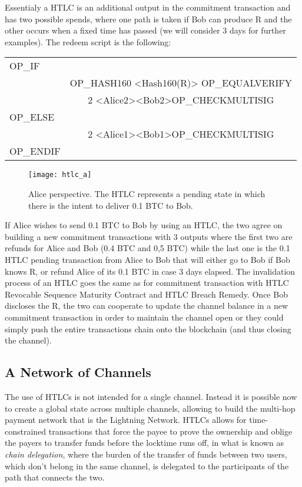		Essentialy a HTLC is an additional output in the commitment transaction and has two possible spends, where one path is taken if Bob can produce R and the other occurs when a fixed time has passed (we will consider 3 days for further examples). The redeem script is the following:
		\begin{center}
			\begin{tabulary}{\textwidth}{|L|C|}
				\hline
				OP\_IF & \\
				 & OP\_HASH160 <Hash160(R)> OP\_EQUALVERIFY \\
				 & 2 <Alice2><Bob2>OP\_CHECKMULTISIG \\ \hline
				OP\_ELSE & \\
				 & 2 <Alice1><Bob1>OP\_CHECKMULTISIG \\ \hline
				 OP\_ENDIF & \\
				 \hline				 
			\end{tabulary}
		\end{center}
	
		\begin{figure}
			\centering
			\texttt{[image: htlc\_a]}
			\caption{Alice perspective. The HTLC represents a pending state in which there is the intent to deliver 0.1 BTC to Bob.}
			\label{htlc_a}
		\end{figure}
	
		If Alice wishes to send 0.1 BTC to Bob by using an HTLC, the two agree on building a new commitment transactions with 3 outputs where the first two are refunds for Alice and Bob (0.4 BTC and 0,5 BTC) while the last one is the 0.1 HTLC pending transaction from Alice to Bob that will either go to Bob if Bob knows R, or refund Alice of its 0.1 BTC in case 3 days elapsed. The invalidation process of an HTLC goes the same as for commitment transaction with HTLC Revocable Sequence Maturity Contract and HTLC Breach Remedy. Once Bob discloses the R, the two can cooperate to update the channel balance in a new commitment transaction in order to maintain the channel open or they could simply push the entire transactions chain onto the blockchain (and thus closing the channel).
		
		\subsection{A Network of Channels}
		
		The use of HTLCs is not intended for a single channel. Instead it is possible now to create a global state across multiple channels, allowing to build the multi-hop payment network that is the Lightning Network. HTLCs allows for time-constrained transactions that force the payee to prove the ownership and oblige the payers to transfer funds before the locktime runs off, in what is known as \textit{chain delegation}, where the burden of the transfer of funds between two users, which don't belong in the same channel, is delegated to the participants of the path that connects the two.

